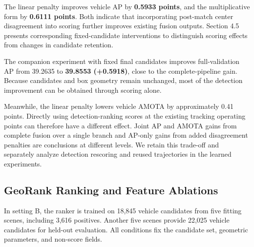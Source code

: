 The linear penalty improves vehicle AP by \textbf{0.5933 points}, and the multiplicative form by \textbf{0.6111 points}. Both indicate that incorporating post-match center disagreement into scoring further improves existing fusion outputs. Section 4.5 presents corresponding fixed-candidate interventions to distinguish scoring effects from changes in candidate retention.

The companion experiment with fixed final candidates improves full-validation AP from 39.2635 to \textbf{39.8553 (+0.5918)}, close to the complete-pipeline gain. Because candidates and box geometry remain unchanged, most of the detection improvement can be obtained through scoring alone.

Meanwhile, the linear penalty lowers vehicle AMOTA by approximately 0.41 points. Directly using detection-ranking scores at the existing tracking operating points can therefore have a different effect. Joint AP and AMOTA gains from complete fusion over a single branch and AP-only gains from added disagreement penalties are conclusions at different levels. We retain this trade-off and separately analyze detection rescoring and reused trajectories in the learned experiments.

\subsection{GeoRank Ranking and Feature Ablations}

In setting B, the ranker is trained on 18,845 vehicle candidates from five fitting scenes, including 3,616 positives. Another five scenes provide 22,025 vehicle candidates for held-out evaluation. All conditions fix the candidate set, geometric parameters, and non-score fields.


